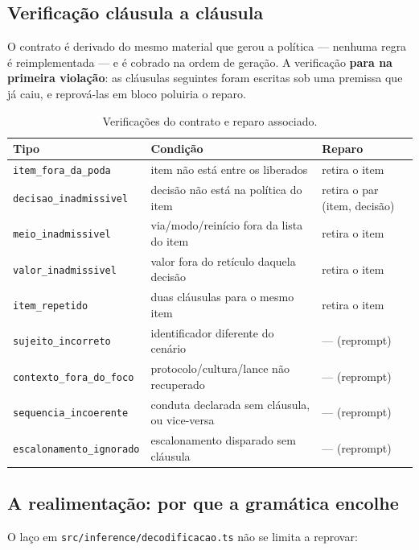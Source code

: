 \documentclass[11pt,a4paper]{article}
\begin{document}
\subsection{Verificação cláusula a cláusula}

O contrato é derivado do mesmo material que gerou a política --- nenhuma regra é
reimplementada --- e é cobrado na ordem de geração. A verificação
\textbf{para na primeira violação}: as cláusulas seguintes foram escritas sob
uma premissa que já caiu, e reprová-las em bloco poluiria o reparo.

\begin{table}[h]
\centering
\small
\caption{Verificações do contrato e reparo associado.}
\label{tab:contrato}
\begin{tabular}{@{}p{3.6cm}p{7.0cm}p{4.0cm}@{}}
\toprule
\textbf{Tipo} & \textbf{Condição} & \textbf{Reparo} \\
\midrule
\texttt{item\_fora\_da\_poda} & item não está entre os liberados & retira o item \\
\texttt{decisao\_inadmissivel} & decisão não está na política do item & retira o par (item, decisão) \\
\texttt{meio\_inadmissivel} & via/modo/reinício fora da lista do item & retira o item \\
\texttt{valor\_inadmissivel} & valor fora do retículo daquela decisão & retira o item \\
\texttt{item\_repetido} & duas cláusulas para o mesmo item & retira o item \\
\texttt{sujeito\_incorreto} & identificador diferente do cenário & --- (reprompt) \\
\texttt{contexto\_fora\_do\_foco} & protocolo/cultura/lance não recuperado & --- (reprompt) \\
\texttt{sequencia\_incoerente} & conduta declarada sem cláusula, ou vice-versa & --- (reprompt) \\
\texttt{escalonamento\_ignorado} & escalonamento disparado sem cláusula & --- (reprompt) \\
\bottomrule
\end{tabular}
\end{table}

\subsection{A realimentação: por que a gramática encolhe}

O laço em \texttt{src/inference/decodificacao.ts} não se limita a reprovar:
\end{document}
